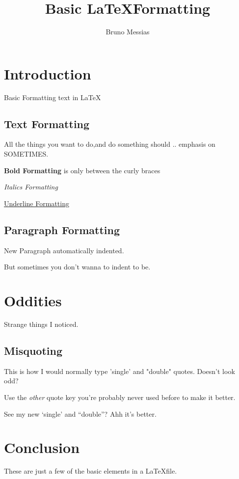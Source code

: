 \documentclass{article}
\title{Basic \LaTeX  Formatting}
\author{Bruno Messias}
\date{}
\begin{document}
\maketitle

\section{Introduction}
Basic Formatting text in \LaTeX

\subsection{Text Formatting}

All the things you want to do,and do something should .. emphasis on SOMETIMES.

\textbf{Bold Formatting} is only between the curly braces

\emph{Italics Formatting}

\underline{Underline Formatting}

\subsection{Paragraph Formatting}

New Paragraph automatically indented.

\noindent But sometimes you don't wanna to indent to be.

\section{Oddities}

Strange things I noticed.

\subsection{Misquoting}

This is how I would normally type 'single'  and "double" quotes. Doesn't look odd?

\noindent Use the \emph{other} quote key you're probably never used before to make it better.

\noindent See my new `single' and ``double''? Ahh it's better.

\section{Conclusion}

These are just a few of the basic elements in a \LaTeX file.
\end{document}
